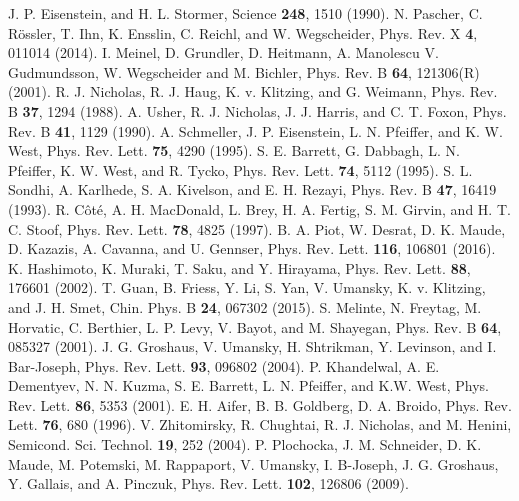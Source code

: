 \documentclass
[aps,prl,twocolumn,superscriptaddress,showpacs,floatfix]{revtex4-1}%
\begin{document}
\begin{thebibliography}{99}                                                                                               %

J. P. Eisenstein, and H. L. Stormer, Science \textbf{248}, 1510 (1990).
N. Pascher, C. Rössler, T. Ihn, K. Ensslin, C. Reichl, and W. Wegscheider, Phys. Rev. X \textbf{4}, 011014 (2014).
I. Meinel, D. Grundler, D. Heitmann, A. Manolescu V. Gudmundsson, W. Wegscheider and M. Bichler, Phys. Rev. B \textbf{64}, 121306(R) (2001).
R. J. Nicholas, R. J. Haug, K. v. Klitzing, and G. Weimann, Phys. Rev. B \textbf{37}, 1294 (1988).
A. Usher, R. J. Nicholas, J. J. Harris, and C. T. Foxon, Phys. Rev. B \textbf{41}, 1129 (1990).
A. Schmeller, J. P. Eisenstein, L. N. Pfeiffer, and K. W. West, Phys. Rev. Lett. \textbf{75}, 4290 (1995).
S. E. Barrett, G. Dabbagh, L. N. Pfeiffer, K. W. West, and R. Tycko, Phys. Rev. Lett. \textbf{74}, 5112 (1995).
S. L. Sondhi, A. Karlhede, S. A. Kivelson, and E. H. Rezayi, Phys. Rev. B \textbf{47}, 16419 (1993).
R. C\^oté, A. H. MacDonald, L. Brey, H. A. Fertig, S. M. Girvin, and H. T. C. Stoof, Phys. Rev. Lett. \textbf{78}, 4825 (1997).
B. A. Piot, W. Desrat, D. K. Maude, D. Kazazis, A. Cavanna, and U. Gennser, Phys. Rev. Lett. \textbf{116}, 106801 (2016).
K. Hashimoto, K. Muraki, T. Saku, and Y. Hirayama, Phys. Rev. Lett. \textbf{88}, 176601 (2002).
T. Guan, B. Friess, Y. Li, S. Yan, V. Umansky, K. v. Klitzing, and J. H. Smet, Chin. Phys. B \textbf{24}, 067302 (2015).
S. Melinte, N. Freytag, M. Horvatic, C. Berthier, L. P. Levy, V. Bayot, and M. Shayegan, Phys. Rev. B \textbf{64}, 085327 (2001).
J. G. Groshaus, V. Umansky, H. Shtrikman, Y. Levinson, and I. Bar-Joseph, Phys. Rev. Lett. \textbf{93}, 096802 (2004).
P. Khandelwal, A. E. Dementyev, N. N. Kuzma, S. E. Barrett, L. N. Pfeiffer, and K.W. West, Phys. Rev. Lett. \textbf{86}, 5353 (2001).
E. H. Aifer, B. B. Goldberg, D. A. Broido, Phys. Rev. Lett. \textbf{76}, 680 (1996).
V. Zhitomirsky, R. Chughtai, R. J. Nicholas, and M. Henini, Semicond. Sci. Technol. \textbf{19}, 252 (2004).
P. Plochocka, J. M. Schneider, D. K. Maude, M. Potemski, M. Rappaport, V. Umansky, I. B-Joseph, J. G. Groshaus, Y. Gallais, and A. Pinczuk, Phys. Rev. Lett. \textbf{102}, 126806 (2009).

\end{thebibliography}
\end{document}
